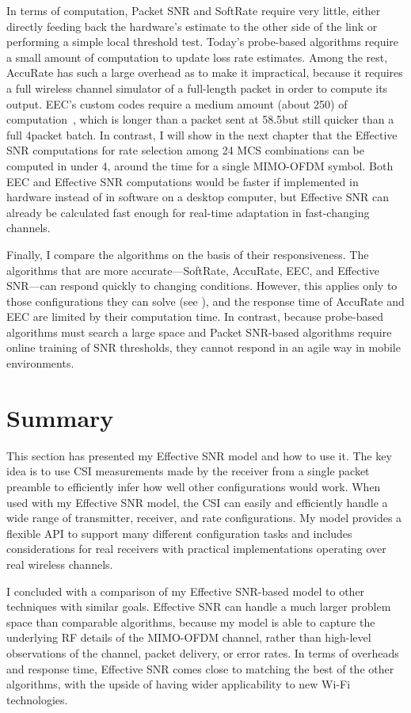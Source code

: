 In terms of computation, Packet SNR and SoftRate require very little, either directly feeding back the hardware's estimate to the other side of the link or performing a simple local threshold test. Today's probe-based algorithms require a small amount of computation to update loss rate estimates. Among the rest, AccuRate has such a large overhead as to make it impractical, because it requires a full wireless channel simulator of a full-length packet in order to compute its output. EEC's custom codes require a medium amount (about 250\us) of computation~\cite{Chen_EEC}, which is longer than a packet sent at 58.5\Mbps but still quicker than a full 4\ms packet batch. In contrast, I will show in the next chapter that the Effective SNR computations for rate selection among 24 MCS combinations can be computed in under 4\us, around the time for a single MIMO-OFDM symbol. Both EEC and Effective SNR computations would be faster if implemented in hardware instead of in software on a desktop computer, but Effective SNR can already be calculated fast enough for real-time adaptation in fast-changing channels.

Finally, I compare the algorithms on the basis of their responsiveness. The algorithms that are more accurate---SoftRate, AccuRate, EEC, and Effective SNR---can respond quickly to changing conditions. However, this applies only to those configurations they can solve (see ), and the response time of AccuRate and EEC are limited by their computation time. In contrast, because probe-based algorithms must search a large space and Packet SNR-based algorithms require online training of SNR thresholds, they cannot respond in an agile way in mobile environments.

\section{Summary}
This section has presented my Effective SNR model and how to use it. The key idea is to use CSI measurements made by the receiver from a single packet preamble to efficiently infer how well other configurations would work. When used with my Effective SNR model, the CSI can easily and efficiently handle a wide range of transmitter, receiver, and rate configurations. My model provides a flexible API to support many different configuration tasks and includes considerations for real receivers with practical implementations operating over real wireless channels.

I concluded with a comparison of my Effective SNR-based model to other techniques with similar goals. Effective SNR can handle a much larger problem space than comparable algorithms, because my model is able to capture the underlying RF details of the MIMO-OFDM channel, rather than high-level observations of the channel, packet delivery, or error rates. In terms of overheads and response time, Effective SNR comes close to matching the best of the other algorithms, with the upside of having wider applicability to new Wi-Fi technologies.

